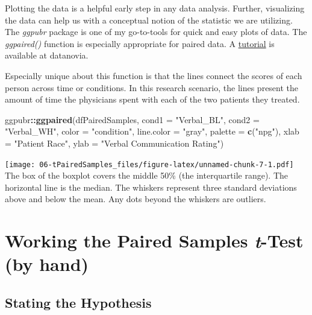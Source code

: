 \documentclass[
  11pt,
]{book}
\newenvironment{Shaded}{\begin{snugshade}}{\end{snugshade}}
\newcommand{\AttributeTok}[1]{\textcolor[rgb]{0.27,0.27,0.27}{#1}}
\newcommand{\FunctionTok}[1]{\textcolor[rgb]{0.27,0.27,0.27}{\textbf{#1}}}
\newcommand{\NormalTok}[1]{#1}
\newcommand{\SpecialCharTok}[1]{\textcolor[rgb]{0.43,0.43,0.43}{\textbf{#1}}}
\newcommand{\StringTok}[1]{\textcolor[rgb]{0.5,0.5,0.5}{#1}}
\begin{document}
Plotting the data is a helpful early step in any data analysis. Further, visualizing the data can help us with a conceptual notion of the statistic we are utilizing. The \emph{ggpubr} package is one of my go-to-tools for quick and easy plots of data. The \emph{ggpaired()} function is especially appropriate for paired data. A \href{https://rpkgs.datanovia.com/ggpubr/reference/ggpaired.html}{tutorial} is available at datanovia.

Especially unique about this function is that the lines connect the scores of each person across time or conditions. In this research scenario, the lines present the amount of time the physicians spent with each of the two patients they treated.

\begin{Shaded}
\begin{Highlighting}[]
\NormalTok{ggpubr}\SpecialCharTok{::}\FunctionTok{ggpaired}\NormalTok{(dfPairedSamples, }\AttributeTok{cond1 =} \StringTok{"Verbal\_BL"}\NormalTok{, }\AttributeTok{cond2 =} \StringTok{"Verbal\_WH"}\NormalTok{,}
    \AttributeTok{color =} \StringTok{"condition"}\NormalTok{, }\AttributeTok{line.color =} \StringTok{"gray"}\NormalTok{, }\AttributeTok{palette =} \FunctionTok{c}\NormalTok{(}\StringTok{"npg"}\NormalTok{), }\AttributeTok{xlab =} \StringTok{"Patient Race"}\NormalTok{,}
    \AttributeTok{ylab =} \StringTok{"Verbal Communication Rating"}\NormalTok{)}
\end{Highlighting}
\end{Shaded}

\texttt{[image: 06-tPairedSamples\_files/figure-latex/unnamed-chunk-7-1.pdf]} The box of the boxplot covers the middle 50\% (the interquartile range). The horizontal line is the median. The whiskers represent three standard deviations above and below the mean. Any dots beyond the whiskers are outliers.

\hypertarget{working-the-paired-samples-t-test-by-hand}{%
\section{\texorpdfstring{Working the Paired Samples \emph{t}-Test (by hand)}{Working the Paired Samples t-Test (by hand)}}\label{working-the-paired-samples-t-test-by-hand}}

\hypertarget{stating-the-hypothesis-2}{%
\subsection{Stating the Hypothesis}\label{stating-the-hypothesis-2}}
\end{document}

